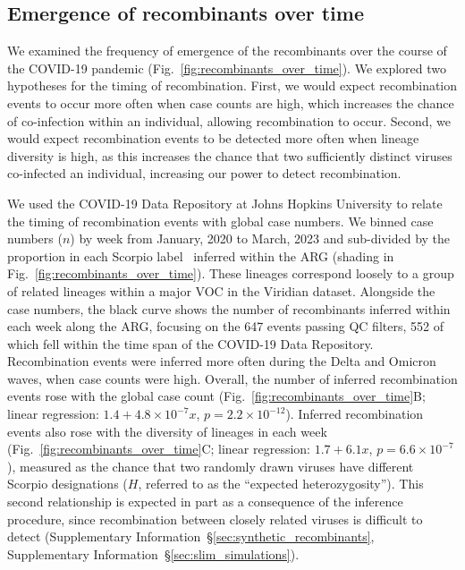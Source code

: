 \documentclass[12pt]{article}
\newcommand{\supref}[1]{Supplementary Information~\S\ref{#1}}
\newcommand{\figref}[1]{Fig.~\ref{#1}}
\begin{document}
\subsection*{Emergence of recombinants over time}

We examined the frequency of emergence of the recombinants
over the course of the COVID-19 pandemic
(\figref{fig:recombinants_over_time}).
We explored two hypotheses for the timing of recombination.
First, we would expect recombination events
to occur more often when case counts are high,
which increases the chance of co-infection within an individual,
allowing recombination to occur.
Second, we would expect recombination events to be detected
more often when lineage diversity is high,
as this increases the chance that
two sufficiently distinct viruses co-infected an individual,
increasing our power to detect recombination.

We used the COVID-19 Data Repository at Johns Hopkins University \cite{Dong2020}
to relate the timing of recombination events with global case numbers. We binned case numbers ($n$) by week from January, 2020 to March, 2023 and
sub-divided by the proportion in each Scorpio label~\cite{Colquhoun2023scorpio}
inferred within the ARG
(shading in \figref{fig:recombinants_over_time}).
These lineages correspond loosely to a group
of related lineages within a major VOC in the Viridian dataset.
Alongside the case numbers,
the black curve shows the number of recombinants
inferred within each week along the ARG,
focusing on the 647 events passing QC filters, 552 of which fell within the time span of the COVID-19 Data Repository.
Recombination events were inferred more often
during the Delta and Omicron waves, when case counts were high.
Overall, the number of inferred recombination events rose with the global case count
(\figref{fig:recombinants_over_time}B;
linear regression: $1.4 + 4.8\times 10^{-7} x$, $p = 2.2\times10^{-12}$).
Inferred recombination events also rose with the diversity of lineages in each week
(\figref{fig:recombinants_over_time}C; linear regression:
$1.7 + 6.1 x$, $p = 6.6\times10^{-7}$),
measured as the chance that two randomly drawn viruses have different Scorpio designations
($H$, referred to as the ``expected heterozygosity'').
This second relationship is expected in part as a consequence of the inference
procedure, since recombination between closely related viruses is
difficult to detect (\supref{sec:synthetic_recombinants},
\supref{sec:slim_simulations}).
\end{document}
